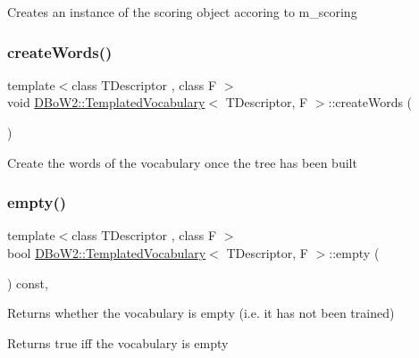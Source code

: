 Creates an instance of the scoring object accoring to m\+\_\+scoring \mbox{\label{class_d_bo_w2_1_1_templated_vocabulary_a9b74d107b7dc6142cbed4e6ef44a8519}} 
\subsubsection{\texorpdfstring{create\+Words()}{createWords()}}
{\footnotesize\ttfamily template$<$class T\+Descriptor , class F $>$ \\
void \mbox{\hyperlink{class_d_bo_w2_1_1_templated_vocabulary}{D\+Bo\+W2\+::\+Templated\+Vocabulary}}$<$ T\+Descriptor, F $>$\+::create\+Words (\begin{DoxyParamCaption}{ }\end{DoxyParamCaption})\hspace{0.3cm}{\ttfamily [protected]}}

Create the words of the vocabulary once the tree has been built \mbox{\label{class_d_bo_w2_1_1_templated_vocabulary_ad7bbb3cf53f8f9f3610b9b67c551ba8e}} 
\subsubsection{\texorpdfstring{empty()}{empty()}}
{\footnotesize\ttfamily template$<$class T\+Descriptor , class F $>$ \\
bool \mbox{\hyperlink{class_d_bo_w2_1_1_templated_vocabulary}{D\+Bo\+W2\+::\+Templated\+Vocabulary}}$<$ T\+Descriptor, F $>$\+::empty (\begin{DoxyParamCaption}{ }\end{DoxyParamCaption}) const\hspace{0.3cm}{\ttfamily [inline]}, {\ttfamily [virtual]}}

Returns whether the vocabulary is empty (i.\+e. it has not been trained) \begin{DoxyReturn}{Returns}
true iff the vocabulary is empty 
\end{DoxyReturn}
\mbox{\label{class_d_bo_w2_1_1_templated_vocabulary_a027d367760c39de816bee5ff0d969837}} 
